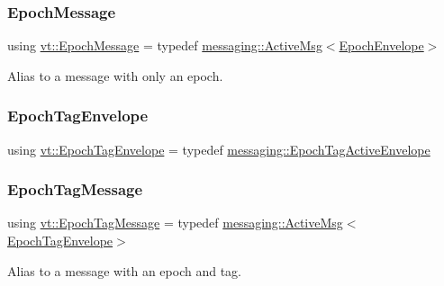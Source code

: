 \mbox{\label{namespacevt_ad67368ffae52d7325002586b41bb150e}} 
\subsubsection{\texorpdfstring{Epoch\+Message}{EpochMessage}}
{\footnotesize\ttfamily using \hyperlink{namespacevt_ad67368ffae52d7325002586b41bb150e}{vt\+::\+Epoch\+Message} = typedef \hyperlink{structvt_1_1messaging_1_1_active_msg}{messaging\+::\+Active\+Msg}$<$\hyperlink{namespacevt_af71a025689a3da5037785b53a7a8e78c}{Epoch\+Envelope}$>$}



Alias to a message with only an epoch. 

\mbox{\label{namespacevt_af23b58014ced6898422213a0e5e6a27a}} 
\subsubsection{\texorpdfstring{Epoch\+Tag\+Envelope}{EpochTagEnvelope}}
{\footnotesize\ttfamily using \hyperlink{namespacevt_af23b58014ced6898422213a0e5e6a27a}{vt\+::\+Epoch\+Tag\+Envelope} = typedef \hyperlink{structvt_1_1messaging_1_1_epoch_tag_active_envelope}{messaging\+::\+Epoch\+Tag\+Active\+Envelope}}

\mbox{\label{namespacevt_a4ccc13b06bff8a4a35426a1a082a95a9}} 
\subsubsection{\texorpdfstring{Epoch\+Tag\+Message}{EpochTagMessage}}
{\footnotesize\ttfamily using \hyperlink{namespacevt_a4ccc13b06bff8a4a35426a1a082a95a9}{vt\+::\+Epoch\+Tag\+Message} = typedef \hyperlink{structvt_1_1messaging_1_1_active_msg}{messaging\+::\+Active\+Msg}$<$\hyperlink{namespacevt_af23b58014ced6898422213a0e5e6a27a}{Epoch\+Tag\+Envelope}$>$}



Alias to a message with an epoch and tag. 

\mbox{\label{namespacevt_a985a5adf291c34a3ca263b3378388236}} 
